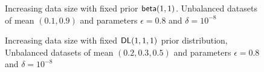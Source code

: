 \documentclass[sigconf]{acmart}
\begin{document}
\begin{figure}[H]
\begin{center}
\centering
\caption{Increasing data size with fixed prior $\mathsf{beta}(1,1)$. Unbalanced datasets of mean $(0.1,0.9)$ and parameters $\epsilon = 0.8$ and $\delta = 10^{-8}$}
\label{fig_vs_datasize}
\end{center}
\end{figure}

\begin{figure}[ht]
\begin{center}
\centering
\caption{Increasing data size with fixed $\mathsf{DL}(1,1,1)$ prior distribution, Unbalanced datasets of mean $(0.2,0.3, 0.5)$ and parameters $\epsilon = 0.8$ and $\delta = 10^{-8}$}
\label{fig_vs_datasize_dir}
\end{center}
\end{figure}
\end{document}
